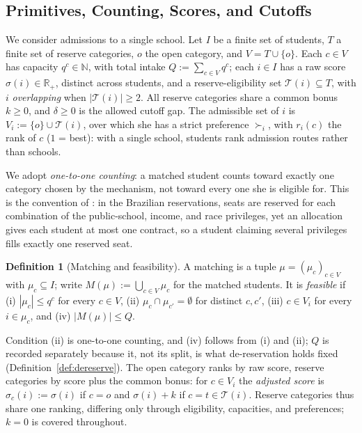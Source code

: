 \documentclass[a4paper,twoside]{article}
\theoremstyle{definition}
\newtheorem{definition}{Definition}
\renewcommand{\T}{\mathcal{T}}
\renewcommand{\R}{\mathbb{R}}
\begin{document}
\subsection{Primitives, Counting, Scores, and Cutoffs}

We consider admissions to a single school. Let $I$ be a finite set of students, $T$ a finite set of reserve categories, $o$ the open category, and $V=T\cup\{o\}$. Each $c\in V$ has capacity $q^c\in\mathbb{N}$, with total intake $Q:=\sum_{c\in V}q^c$; each $i\in I$ has a raw score $\sigma(i)\in\R_+$, distinct across students, and a reserve-eligibility set $\T(i)\subseteq T$, with $i$ \emph{overlapping} when $|\T(i)|\ge2$. All reserve categories share a common bonus $k\ge0$, and $\delta\ge0$ is the allowed cutoff gap. The admissible set of $i$ is $V_i:=\{o\}\cup\T(i)$, over which she has a strict preference $\succ_i$, with $r_i(c)$ the rank of $c$ ($1$ = best): with a single school, students rank admission routes rather than schools.

We adopt \emph{one-to-one counting}: a matched student counts toward exactly one category chosen by the mechanism, not toward every one she is eligible for. This is the convention of \cite{AyBo21a,KHIY17a,GKK+17a}: in the Brazilian reservations, seats are reserved for each combination of the public-school, income, and race privileges, yet an allocation gives each student at most one contract, so a student claiming several privileges fills exactly one reserved seat.

\begin{definition}[Matching and feasibility]
A matching is a tuple $\mu=(\mu_c)_{c\in V}$ with $\mu_c\subseteq I$; write $M(\mu):=\bigcup_{c\in V}\mu_c$ for the matched students. It is \emph{feasible} if (i) $|\mu_c|\le q^c$ for every $c\in V$, (ii) $\mu_c\cap\mu_{c'}=\emptyset$ for distinct $c,c'$, (iii) $c\in V_i$ for every $i\in\mu_c$, and (iv) $|M(\mu)|\le Q$.
\end{definition}

Condition (ii) is one-to-one counting, and (iv) follows from (i) and (ii); $Q$ is recorded separately because it, not its split, is what de-reservation holds fixed (Definition~\ref{def:dereserve}). The open category ranks by raw score, reserve categories by score plus the common bonus: for $c\in V_i$ the \emph{adjusted score} is $\sigma_c(i):=\sigma(i)$ if $c=o$ and $\sigma(i)+k$ if $c=t\in\T(i)$. Reserve categories thus share one ranking, differing only through eligibility, capacities, and preferences; $k=0$ is covered throughout.
\end{document}
